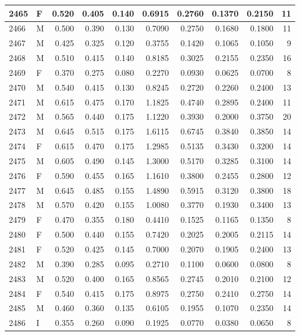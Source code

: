 \documentclass[9pt,twocolumn,twoside,]{pnas-new}
\begin{document}
\begin{tabular}{l|l|r|r|r|r|r|r|r|r}
\hline
2465 & F & 0.520 & 0.405 & 0.140 & 0.6915 & 0.2760 & 0.1370 & 0.2150 & 11\\
\hline
2466 & M & 0.500 & 0.390 & 0.130 & 0.7090 & 0.2750 & 0.1680 & 0.1800 & 11\\
\hline
2467 & M & 0.425 & 0.325 & 0.120 & 0.3755 & 0.1420 & 0.1065 & 0.1050 & 9\\
\hline
2468 & M & 0.510 & 0.415 & 0.140 & 0.8185 & 0.3025 & 0.2155 & 0.2350 & 16\\
\hline
2469 & F & 0.370 & 0.275 & 0.080 & 0.2270 & 0.0930 & 0.0625 & 0.0700 & 8\\
\hline
2470 & M & 0.540 & 0.415 & 0.130 & 0.8245 & 0.2720 & 0.2260 & 0.2400 & 13\\
\hline
2471 & M & 0.615 & 0.475 & 0.170 & 1.1825 & 0.4740 & 0.2895 & 0.2400 & 11\\
\hline
2472 & M & 0.565 & 0.440 & 0.175 & 1.1220 & 0.3930 & 0.2000 & 0.3750 & 20\\
\hline
2473 & M & 0.645 & 0.515 & 0.175 & 1.6115 & 0.6745 & 0.3840 & 0.3850 & 14\\
\hline
2474 & F & 0.615 & 0.470 & 0.175 & 1.2985 & 0.5135 & 0.3430 & 0.3200 & 14\\
\hline
2475 & M & 0.605 & 0.490 & 0.145 & 1.3000 & 0.5170 & 0.3285 & 0.3100 & 14\\
\hline
2476 & F & 0.590 & 0.455 & 0.165 & 1.1610 & 0.3800 & 0.2455 & 0.2800 & 12\\
\hline
2477 & M & 0.645 & 0.485 & 0.155 & 1.4890 & 0.5915 & 0.3120 & 0.3800 & 18\\
\hline
2478 & M & 0.570 & 0.420 & 0.155 & 1.0080 & 0.3770 & 0.1930 & 0.3400 & 13\\
\hline
2479 & F & 0.470 & 0.355 & 0.180 & 0.4410 & 0.1525 & 0.1165 & 0.1350 & 8\\
\hline
2480 & F & 0.500 & 0.440 & 0.155 & 0.7420 & 0.2025 & 0.2005 & 0.2115 & 14\\
\hline
2481 & F & 0.520 & 0.425 & 0.145 & 0.7000 & 0.2070 & 0.1905 & 0.2400 & 13\\
\hline
2482 & M & 0.390 & 0.285 & 0.095 & 0.2710 & 0.1100 & 0.0600 & 0.0800 & 8\\
\hline
2483 & M & 0.520 & 0.400 & 0.165 & 0.8565 & 0.2745 & 0.2010 & 0.2100 & 12\\
\hline
2484 & F & 0.540 & 0.415 & 0.175 & 0.8975 & 0.2750 & 0.2410 & 0.2750 & 14\\
\hline
2485 & M & 0.460 & 0.360 & 0.135 & 0.6105 & 0.1955 & 0.1070 & 0.2350 & 14\\
\hline
2486 & I & 0.355 & 0.260 & 0.090 & 0.1925 & 0.0770 & 0.0380 & 0.0650 & 8\\

\end{tabular}
\end{document}
